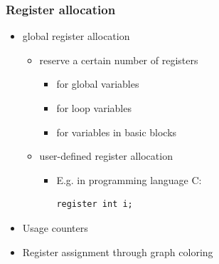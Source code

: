 \subsubsection{Register allocation}
\begin{itemize}
	\item global register allocation
\begin{itemize}
	\item reserve a certain number of registers
\begin{itemize}
	\item for global variables
	\item for loop variables
	\item for variables in basic blocks
\end{itemize}
	\item user-defined register allocation
\begin{itemize}
	\item E.g. in programming language C: 
	\begin{verbatim}register int i;\end{verbatim}
\end{itemize}
\end{itemize}
	\item Usage counters
	\item Register assignment through graph coloring
\end{itemize}

